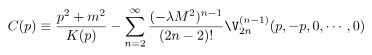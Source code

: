\begin{equation}
C(p) \equiv \frac{p^2+m^2}{K(p)} - \sum_{n=2}^\infty \frac{(- \lambda
M^2)^{n-1}}{(2n-2)!}  \V_{2n}^{(n-1)} (p,-p,0,\cdots,0)
\end{equation}

